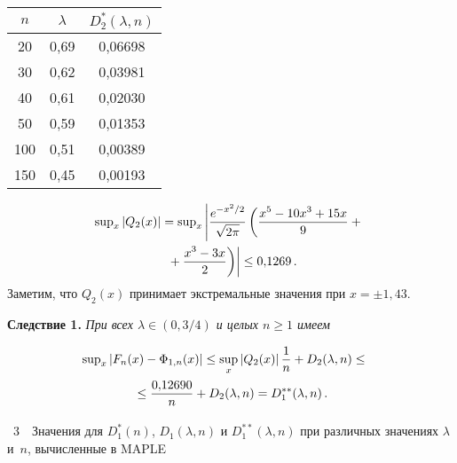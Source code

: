 \begin{multicols}{2}
\begin{center}
\vspace*{2ex}
\tabcolsep=15.6pt
{\small
\begin{tabular}{|c|c|c|}
\hline
$n$    & $\lambda$ & $D_2^*(\lambda,n)$\\
\hline
\hphantom{9}20   & 0,69 & 0,06698\\
\hphantom{9}30   &0,62 & 0,03981\\
\hphantom{9}40    &0,61 & 0,02030\\
\hphantom{9}50  & 0,59& 0,01353\\
100   & 0,51 & 0,00389\\
150 & 0,45 & 0,00193\\
\hline 
\end{tabular}
}
\end{center}

\smallskip
\addtocounter{table}{1}



\noindent
\begin{multline*} 
\sup\nolimits_x|Q_2(x)|=\sup\nolimits_x \left|\displaystyle\frac{\displaystyle e^{-x^2/2}\mathstrut}{\displaystyle \sqrt{2\pi}\mathstrut}
  \left( \displaystyle\frac{\displaystyle x^5 -10x^3+15x\mathstrut}{\displaystyle 9\mathstrut}+{}\right.\right.\\
\left.\left.  {}+\displaystyle\frac{\displaystyle x^3-3x\mathstrut}{\displaystyle 2\mathstrut}\right)\right|\leq 0{,}1269\,.
  \end{multline*}
Заметим, что $Q_2(x)$ принимает экстремальные значения при   $x=\pm 1{,}43$.

\smallskip

\noindent
\textbf{Следствие 1.} \textit{При всех $\lambda \in (0,3/4)$  и целых $n\geq 1$ имеем}

\vspace*{-3pt}

\noindent
\begin{multline}
\!\! \!\!\!\sup\nolimits_x \left\vert F_n(x) - \Phi_{1,n}(x)\right\vert
  \leq \sup_x \left\vert Q_2(x)\right\vert  \displaystyle\frac{\displaystyle 1\mathstrut}{\displaystyle n\mathstrut} + 
  D_2(\lambda,n) \leq {}\\
  {}\leq \displaystyle\frac{\displaystyle 0{,}12690\mathstrut}{\displaystyle n\mathstrut} +D_2(\lambda,n)=D_1^{**}(\lambda,n)\,.
  \label{g6a}
\end{multline}


\noindent
\begin{center}
\parbox{80mm}{{\tablename~3}\ \ \small{Значения для $D^*_1(n)$, $D_1(\lambda,n)$ и $D_1^{**}(\lambda,n)$ 
при различных значениях  $\lambda$  и~$n$, вычисленные в    MAPLE}}


\end{center}
\end{multicols}
